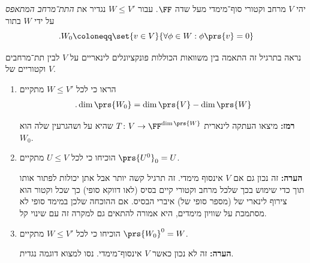 \documentclass[a4paper,10pt,twoside,openany]{article}
\begin{document}
\begin{exercise}
יהי
$V$
מרחב וקטורי סוף־מימדי מעל שדה
$\FF$.
עבור
$W \leq V'$
נגדיר את
\emph{התת־מרחב המתאפס}
על ידי
$W$
בתור
\[\text{.} W_0 \coloneqq \set{v \in V}{\forall \phi \in W: \phi\prs{v} = 0}\]

נראה בתרגיל זה התאמה בין משוואות הכוללות פונקציונלים לינאריים על
$V$
לבין תת־מרחבים וקטוריים של
$V$.

\begin{enumerate}
\item הראו כי לכל
$W \leq V'$
מתקיים
\begin{align*}
\text{.} \dim \prs{W_0} = \dim\prs{V} - \dim\prs{W}
\end{align*}

\textbf{רמז:}
מיצאו העתקה לינארית
$T \colon V \to \FF^{\dim\prs{W}}$
שהיא על ושהגרעין שלה הוא
$W_0$.

\item הוכיחו כי לכל
$U \leq V$
מתקיים
$\prs{U^0}_0 = U$.

\textbf{הערה:}
זה נכון גם אם
$V$
אינסוף מימדי. זה תרגיל קשה יותר אבל אתן יכולות לפתור אותו תוך כדי שימוש בכך שלכל מרחב וקטורי קיים בסיס (לאו דווקא סופי) כך שכל וקטור הוא צירוף לינארי של (מספר סופי של) איברי הבסיס. אם ההוכחה שלכן במימד סופי לא מסתמכת על שוויון מימדים, היא אמורה להתאים גם למקרה זה עם שינוי קל.

\item הוכיחו כי לכל
$W \leq V'$
מתקיים
$\prs{W_0}^0 = W$.

\textbf{הערה:}
זה לא נכון כאשר
$V$
אינסוף־מימדי. נסו למצוא דוגמה נגדית.
\end{enumerate}
\end{exercise}
\end{document}

